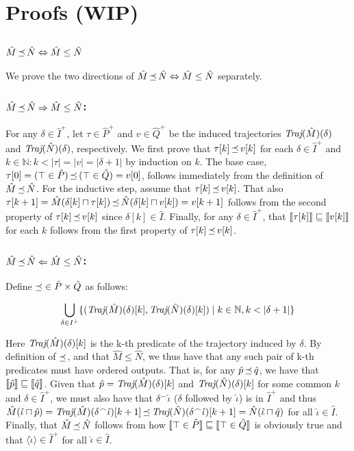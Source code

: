 \section{Proofs (WIP)}

\subsection{$\hat M \operatorname{\mathrel{\preceq}} \hat N \Leftrightarrow \hat M \leq \hat N$}

We prove the two directions of $\hat M \operatorname{\mathrel{\preceq}} \hat N \Leftrightarrow \hat M \leq \hat N$ separately.

\subsubsection{$\hat M \operatorname{\mathrel{\preceq}} \hat N \Rightarrow \hat M \leq \hat N$:} For any $\delta \in \hat I^{+}$, let $\tau \in \hat P^{+}$ and $v \in \hat Q^{+}$ be the induced trajectories $\textit{Traj}(\hat M)(\delta)$ and $\textit{Traj}(\hat N)(\delta)$, respectively. We first prove that $\tau[k] \operatorname{\mathrel{\preceq}} v[k]$ for each $\delta \in \hat I^{+}$ and $k \in \mathbb{N} : k < | \tau | = | v | = | \delta + 1 |$ by induction on $k$. The base case, $\tau[0] = (\top \in \hat P) \operatorname{\mathrel{\preceq}} \, (\top \in \hat Q) = v[0]$, follows immediately from the definition of $\hat M \operatorname{\mathrel{\preceq}} \hat N$. For the inductive step, assume that $\tau[k] \operatorname{\mathrel{\preceq}} v[k]$. That also $\tau[k+1] = \hat M(\delta[k] \sqcap \tau[k]) \operatorname{\mathrel{\preceq}} \hat N(\delta[k] \sqcap v[k]) = v[k+1]$ follows from the second property of $\tau[k] \operatorname{\mathrel{\preceq}} v[k]$ since $\delta[k] \in \hat I$. Finally, for any $\delta \in \hat I^{+}$, that $\llbracket\tau[k]\rrbracket \sqsubseteq \llbracket v[k]\rrbracket$ for each $k$ follows from the first property of $\tau[k] \operatorname{\mathrel{\preceq}} v[k]$.

\subsubsection{$\hat M \operatorname{\mathrel{\preceq}} \hat N \Leftarrow \hat M \leq \hat N$:} Define $\operatorname{\mathrel{\preceq}} \in \hat P \times \hat Q$ as follows:

\begin{equation*}
\bigcup_{\delta \in I^{+}} \{ (\textit{Traj}(\hat M)(\delta)[k], \textit{Traj}(\hat N)(\delta)[k]) \mid k \in \mathbb{N}, k < | \delta + 1 | \}
\end{equation*}

\noindent Here $\textit{Traj}(\hat M)(\delta)[k]$ is the k-th predicate of the trajectory induced by $\delta$. By definition of $\operatorname{\mathrel{\preceq}}$, and that $\hat M \leq \hat N$, we thus have that any such pair of k-th predicates must have ordered outputs. That is, for any $\hat p \operatorname{\mathrel{\preceq}} \hat q$, we have that $\llbracket\hat p\rrbracket \sqsubseteq \llbracket\hat q\rrbracket$. Given that $\hat p = \textit{Traj}(\hat M)(\delta)[k]$ and $\textit{Traj}(\hat N)(\delta)[k]$ for some common $k$ and $\delta \in \hat I^{+}$, we must also have that $\delta^{\frown}\hat \iota$ ($\delta$ followed by $\hat \iota$) is in $\hat I^{+}$ and thus $\hat M(\hat \iota \sqcap \hat p) = \textit{Traj}(\hat M)(\delta^{\frown}\hat \iota)[k+1] \operatorname{\mathrel{\preceq}} \textit{Traj}(\hat N)(\delta^{\frown}\hat \iota)[k+1] = \hat N(\hat \iota \sqcap \hat q)$ for all $\hat \iota \in \hat I$. Finally, that $\hat M \operatorname{\mathrel{\preceq}} \hat N$ follows from how $\llbracket\top \in \hat P\rrbracket \sqsubseteq \llbracket\top \in \hat Q\rrbracket$ is obviously true and that $\langle \hat \iota \rangle \in \hat I^{+}$ for all $\hat \iota \in \hat I$.

